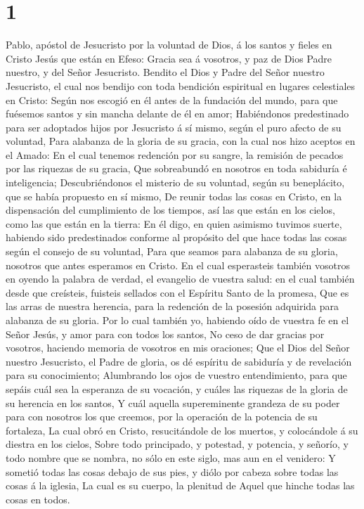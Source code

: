 \hypertarget{section}{%
\section{1}\label{section}}

 Pablo, apóstol de Jesucristo por la voluntad de Dios, á los
santos y fieles en Cristo Jesús que están en Efeso:  Gracia
sea á vosotros, y paz de Dios Padre nuestro, y del Señor Jesucristo.
 Bendito el Dios y Padre del Señor nuestro Jesucristo, el
cual nos bendijo con toda bendición espiritual en lugares celestiales en
Cristo:  Según nos escogió en él antes de la fundación del
mundo, para que fuésemos santos y sin mancha delante de él en amor;
 Habiéndonos predestinado para ser adoptados hijos por
Jesucristo á sí mismo, según el puro afecto de su voluntad, 
Para alabanza de la gloria de su gracia, con la cual nos hizo aceptos en
el Amado:  En el cual tenemos redención por su sangre, la
remisión de pecados por las riquezas de su gracia,  Que
sobreabundó en nosotros en toda sabiduría é inteligencia; 
Descubriéndonos el misterio de su voluntad, según su beneplácito, que se
había propuesto en sí mismo,  De reunir todas las cosas en
Cristo, en la dispensación del cumplimiento de los tiempos, así las que
están en los cielos, como las que están en la tierra:  En
él digo, en quien asimismo tuvimos suerte, habiendo sido predestinados
conforme al propósito del que hace todas las cosas según el consejo de
su voluntad,  Para que seamos para alabanza de su gloria,
nosotros que antes esperamos en Cristo.  En el cual
esperasteis también vosotros en oyendo la palabra de verdad, el
evangelio de vuestra salud: en el cual también desde que creísteis,
fuisteis sellados con el Espíritu Santo de la promesa,  Que
es las arras de nuestra herencia, para la redención de la posesión
adquirida para alabanza de su gloria.  Por lo cual también
yo, habiendo oído de vuestra fe en el Señor Jesús, y amor para con todos
los santos,  No ceso de dar gracias por vosotros, haciendo
memoria de vosotros en mis oraciones;  Que el Dios del
Señor nuestro Jesucristo, el Padre de gloria, os dé espíritu de
sabiduría y de revelación para su conocimiento;  Alumbrando
los ojos de vuestro entendimiento, para que sepáis cuál sea la esperanza
de su vocación, y cuáles las riquezas de la gloria de su herencia en los
santos,  Y cuál aquella supereminente grandeza de su poder
para con nosotros los que creemos, por la operación de la potencia de su
fortaleza,  La cual obró en Cristo, resucitándole de los
muertos, y colocándole á su diestra en los cielos,  Sobre
todo principado, y potestad, y potencia, y señorío, y todo nombre que se
nombra, no sólo en este siglo, mas aun en el venidero:  Y
sometió todas las cosas debajo de sus pies, y diólo por cabeza sobre
todas las cosas á la iglesia,  La cual es su cuerpo, la
plenitud de Aquel que hinche todas las cosas en todos.

